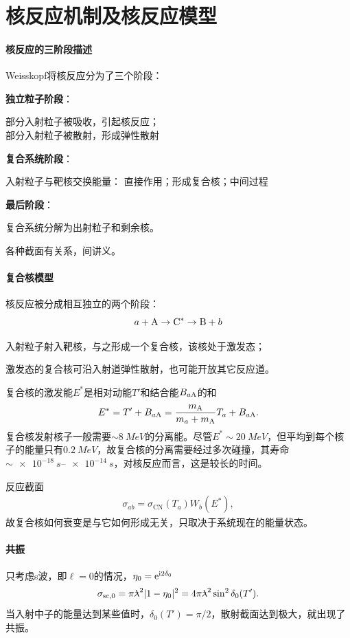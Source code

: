 \section{核反应机制及核反应模型}
\paragraph{核反应的三阶段描述}Weisskopf将核反应分为了三个阶段：
\begin{compactenum}
	\item \textbf{独立粒子阶段}：
	
	部分入射粒子被吸收，引起核反应；\\
	部分入射粒子被散射，形成弹性散射
	\item \textbf{复合系统阶段}：
	
	入射粒子与靶核交换能量：
	直接作用；形成复合核；中间过程
	\item \textbf{最后阶段}：
	
	复合系统分解为出射粒子和剩余核。
\end{compactenum}
各种截面有关系，间讲义。
\paragraph{复合核模型}核反应被分成相互独立的两个阶段：
\[
	a+\mathrm{A}\to\mathrm{C}^\ast\to\mathrm{B}+b
\]
\begin{compactenum}
	\item 入射粒子射入靶核，与之形成一个复合核，该核处于激发态；
	\item 激发态的复合核可沿入射道弹性散射，也可能开放其它反应道。
\end{compactenum}
复合核的激发能$E^\ast$是相对动能$T'$和结合能$B_{a\mathrm{A}}$的和
\begin{align}
	E^\ast=T'+B_{a\mathrm{A}}=\frac{m_{\mathrm{A}}}{m_a+m_{\mathrm{A}}}T_a+B_{a\mathrm{A}}.
\end{align}
复合核发射核子一般需要$\sim\SI{8}{MeV}$的分离能。尽管$E^\ast\sim\SI{20}{MeV}$，但平均到每个核子的能量只有$\SI{0.2}{MeV}$，故复合核的分离需要经过多次碰撞，其寿命$\sim\SIrange{e-18}{e-14}{s}$，对核反应而言，这是较长的时间。

反应截面
\begin{align}
	\sigma_{ab}=\sigma_{\mathrm{CN}}(T_a)W_b(E^\ast),
\end{align}
故复合核如何衰变是与它如何形成无关，只取决于系统现在的能量状态。
\paragraph{共振}只考虑s波，即$\ell=0$的情况，$\eta_0=\mathop{}\!\mathrm{e}^{\mathrm{i}2\delta_0}$
\[
	\sigma_{\mathrm{sc},0}=\pi\lambdabar^2|1-\eta_0|^2=4\pi\lambdabar^2\sin^2\delta_0(T').
\]
当入射中子的能量达到某些值时，$\delta_0(T')=\pi/2$，散射截面达到极大，就出现了共振。

